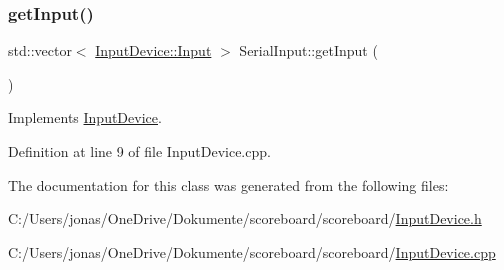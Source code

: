\subsubsection{\texorpdfstring{get\+Input()}{getInput()}}
{\footnotesize\ttfamily std\+::vector$<$ \hyperlink{class_input_device_a75152d8f06b6d032036014e42e44688b}{Input\+Device\+::\+Input} $>$ Serial\+Input\+::get\+Input (\begin{DoxyParamCaption}{ }\end{DoxyParamCaption})\hspace{0.3cm}{\ttfamily [virtual]}}



Implements \hyperlink{class_input_device_a946ae438b3a044741614493000aa216f}{Input\+Device}.



Definition at line 9 of file Input\+Device.\+cpp.



The documentation for this class was generated from the following files\+:\begin{DoxyCompactItemize}
\item 
C\+:/\+Users/jonas/\+One\+Drive/\+Dokumente/scoreboard/scoreboard/\hyperlink{_input_device_8h}{Input\+Device.\+h}\item 
C\+:/\+Users/jonas/\+One\+Drive/\+Dokumente/scoreboard/scoreboard/\hyperlink{_input_device_8cpp}{Input\+Device.\+cpp}\end{DoxyCompactItemize}
